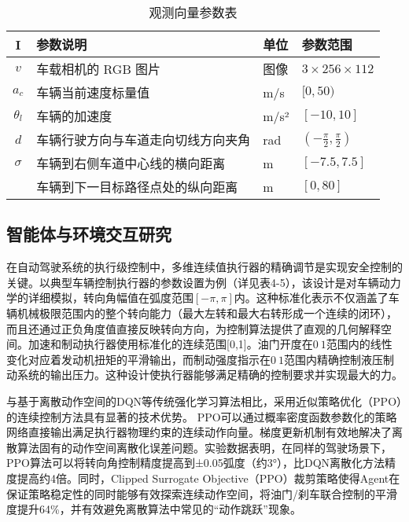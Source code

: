 \begin{table}[htbp]
	\centering
	\caption{观测向量参数表}
	\label{tab:observation_params}
	\begin{tabular}{clll}
		\toprule
		\textbf{I} & \textbf{参数说明} & \textbf{单位} & \textbf{参数范围} \\
		\midrule
		\( v \)   & 车载相机的 RGB 图片                     & 图像 & \( 3 \times 256 \times 112 \) \\
		\( a_c \) & 车辆当前速度标量值                       & m/s  & \([0, 50)\) \\
		\( \theta_l \) & 车辆的加速度                         & m/s² & \([-10, 10]\) \\
		\( d \)   & 车辆行驶方向与车道走向切线方向夹角       & rad  & \(\left(-\frac{\pi}{2}, \frac{\pi}{2}\right)\) \\
		\( \sigma \) & 车辆到右侧车道中心线的横向距离         & m    & \([-7.5, 7.5]\) \\
		& 车辆到下一目标路径点处的纵向距离         & m    & \([0, 80]\) \\
		\bottomrule
	\end{tabular}
\end{table}

\subsection{智能体与环境交互研究}

在自动驾驶系统的执行级控制中，多维连续值执行器的精确调节是实现安全控制的关键。以典型车辆控制执行器的参数设置为例（详见表4-5），该设计是对车辆动力学的详细模拟，转向角幅值在弧度范围\([-π,π]\)内。这种标准化表示不仅涵盖了车辆机械极限范围内的整个转向能力（最大左转和最大右转形成一个连续的闭环），而且还通过正负角度值直接反映转向方向，为控制算法提供了直观的几何解释空间。加速和制动执行器使用标准化的连续范围[0,1]。油门开度在\(0~1\)范围内的线性变化对应着发动机扭矩的平滑输出，而制动强度指示在\(0~1\)范围内精确控制液压制动系统的输出压力。这种设计使执行器能够满足精确的控制要求并实现最大的力。

与基于离散动作空间的DQN等传统强化学习算法相比，采用近似策略优化（PPO）的连续控制方法具有显著的技术优势。 PPO可以通过概率密度函数参数化的策略网络直接输出满足执行器物理约束的连续动作向量。梯度更新机制有效地解决了离散算法固有的动作空间离散化误差问题。实验数据表明，在同样的驾驶场景下，PPO算法可以将转向角控制精度提高到±0.05弧度（约3°），比DQN离散化方法精度提高约4倍。同时，Clipped Surrogate Objective（PPO）裁剪策略使得Agent在保证策略稳定性的同时能够有效探索连续动作空间，将油门/刹车联合控制的平滑度提升64\%，并有效避免离散算法中常见的“动作跳跃”现象。


